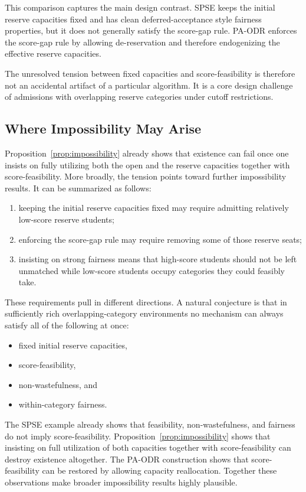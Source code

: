\documentclass[runningheads]{llncs}
\newcommand{\1}{\mathbf{1}}
\begin{document}
This comparison captures the main design contrast. SPSE keeps the initial reserve capacities fixed and has clean deferred-acceptance style fairness properties, but it does not generally satisfy the score-gap rule. PA-ODR enforces the score-gap rule by allowing de-reservation and therefore endogenizing the effective reserve capacities.

The unresolved tension between fixed capacities and score-feasibility is therefore not an accidental artifact of a particular algorithm. It is a core design challenge of admissions with overlapping reserve categories under cutoff restrictions.

\subsection{Where Impossibility May Arise}
Proposition~\ref{prop:impossibility} already shows that existence can fail once one insists on fully utilizing both the open and the reserve capacities together with score-feasibility. More broadly, the tension points toward further impossibility results. It can be summarized as follows:

\begin{enumerate}
\item keeping the initial reserve capacities fixed may require admitting relatively low-score reserve students;
\item enforcing the score-gap rule may require removing some of those reserve seats;
\item insisting on strong fairness means that high-score students should not be left unmatched while low-score students occupy categories they could feasibly take.
\end{enumerate}

These requirements pull in different directions. A natural conjecture is that in sufficiently rich overlapping-category environments no mechanism can always satisfy all of the following at once:
\begin{itemize}
\item fixed initial reserve capacities,
\item score-feasibility,
\item non-wastefulness, and
\item within-category fairness.
\end{itemize}

The SPSE example already shows that feasibility, non-wastefulness, and fairness do not imply score-feasibility. Proposition~\ref{prop:impossibility} shows that insisting on full utilization of both capacities together with score-feasibility can destroy existence altogether. The PA-ODR construction shows that score-feasibility can be restored by allowing capacity reallocation. Together these observations make broader impossibility results highly plausible.
\end{document}

